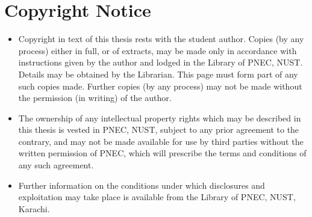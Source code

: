     \newpage
    \chapter*{Copyright Notice} %
    \label{cha:copyright_notice}
    \begin{itemize}
        \item Copyright in text of this thesis rests with the student author. Copies (by 	any process) either in full, or of extracts, may be made only in accordance with instructions given by the author and lodged in the Library of PNEC, NUST. Details may be obtained by the Librarian. This page must form part of any such copies made. Further copies (by any process) may not be made without the permission (in writing) of the author.
        \item The ownership of any intellectual property rights which may be described in this thesis is vested in PNEC, NUST, subject to any prior agreement to the contrary, and may not be made available for use by third parties without the written permission of PNEC, which will prescribe the terms and conditions of any such agreement.
        \item Further information on the conditions under which disclosures and exploitation may take place is available from the Library of PNEC, NUST, Karachi.
    \end{itemize}
    \vfill
	\begin{center} 
    	\\
	\end{center}
